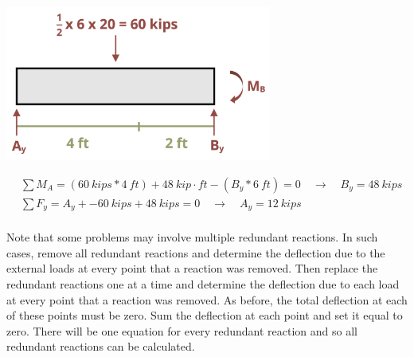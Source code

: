 \documentclass[
  letterpaper,
  DIV=11,
  numbers=noendperiod]{scrreprt}
\theoremstyle{definition}
\theoremstyle{remark}
\begin{document}
\begin{tcolorbox}
\begin{tcolorbox}
\begin{center}
\includegraphics[width=3.4375in,height=\textheight]{images/clipboard-736394062.png}
\end{center}

\[
\begin{aligned}
&\sum M_A=(60{~kips}*4{~ft})+48{~kip}\cdot{ft}-(B_y*6{~ft})=0 \quad\rightarrow\quad B_y=48{~kips} \\
&\sum F_y=A_y+-60{~kips}+48{~kips}=0 \quad\rightarrow\quad A_y=12{~kips}\\
\end{aligned}
\]

\end{tcolorbox}

\end{tcolorbox}

Note that some problems may involve multiple redundant reactions. In
such cases, remove all redundant reactions and determine the deflection
due to the external loads at every point that a reaction was removed.
Then replace the redundant reactions one at a time and determine the
deflection due to each load at every point that a reaction was removed.
As before, the total deflection at each of these points must be zero.
Sum the deflection at each point and set it equal to zero. There will be
one equation for every redundant reaction and so all redundant reactions
can be calculated.
\end{document}
